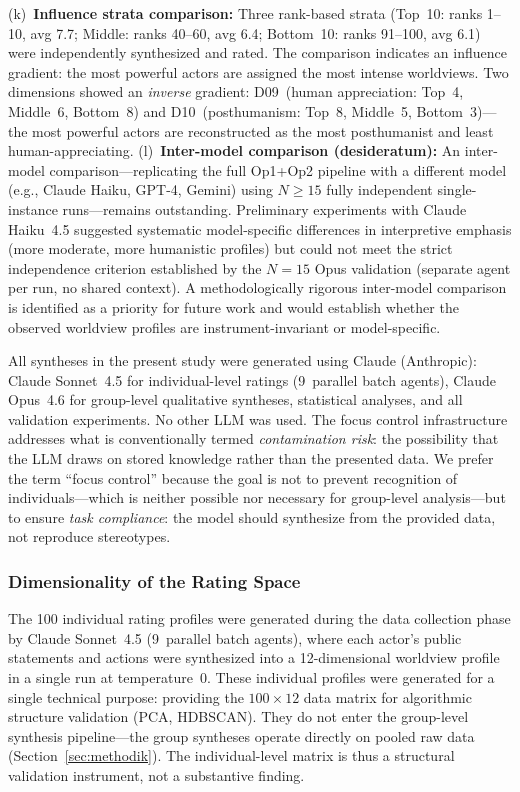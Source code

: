 \documentclass[12pt,a4paper]{article}
\begin{document}
(k)~\textbf{Influence strata comparison:} Three rank-based strata (Top~10: ranks 1--10, avg 7.7; Middle: ranks 40--60, avg 6.4; Bottom~10: ranks 91--100, avg 6.1) were independently synthesized and rated. The comparison indicates an influence gradient: the most powerful actors are assigned the most intense worldviews. Two dimensions showed an \emph{inverse} gradient: D09~(human appreciation: Top~4, Middle~6, Bottom~8) and D10~(posthumanism: Top~8, Middle~5, Bottom~3)---the most powerful actors are reconstructed as the most posthumanist and least human-appreciating.
(l)~\textbf{Inter-model comparison (desideratum):} An inter-model comparison---replicating the full Op1+Op2 pipeline with a different model (e.g., Claude Haiku, GPT-4, Gemini) using $N \geq 15$ fully independent single-instance runs---remains outstanding. Preliminary experiments with Claude Haiku~4.5 suggested systematic model-specific differences in interpretive emphasis (more moderate, more humanistic profiles) but could not meet the strict independence criterion established by the $N = 15$ Opus validation (separate agent per run, no shared context). A methodologically rigorous inter-model comparison is identified as a priority for future work and would establish whether the observed worldview profiles are instrument-invariant or model-specific.

All syntheses in the present study were generated using Claude (Anthropic): Claude Sonnet~4.5 for individual-level ratings (9~parallel batch agents), Claude Opus~4.6 for group-level qualitative syntheses, statistical analyses, and all validation experiments. No other LLM was used. The focus control infrastructure addresses what is conventionally termed \emph{contamination risk}: the possibility that the LLM draws on stored knowledge rather than the presented data. We prefer the term ``focus control'' because the goal is not to prevent recognition of individuals---which is neither possible nor necessary for group-level analysis---but to ensure \emph{task compliance}: the model should synthesize from the provided data, not reproduce stereotypes.


\subsubsection{Dimensionality of the Rating Space}

The 100 individual rating profiles were generated during the data collection phase by Claude Sonnet~4.5 (9~parallel batch agents), where each actor's public statements and actions were synthesized into a 12-dimensional worldview profile in a single run at temperature~0. These individual profiles were generated for a single technical purpose: providing the $100 \times 12$ data matrix for algorithmic structure validation (PCA, HDBSCAN). They do not enter the group-level synthesis pipeline---the group syntheses operate directly on pooled raw data (Section~\ref{sec:methodik}). The individual-level matrix is thus a structural validation instrument, not a substantive finding.
\end{document}
